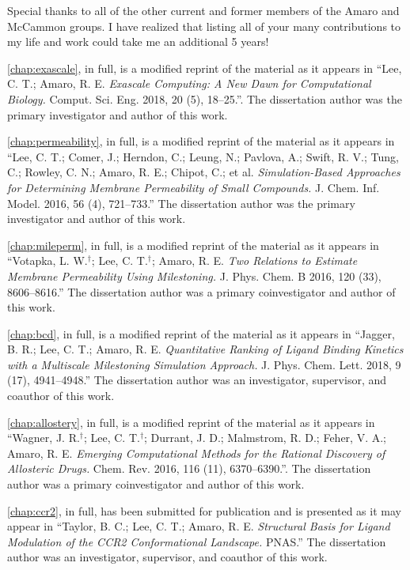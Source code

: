 \begin{frontmatter}
\begin{acknowledgements}
\par Special thanks to all of the other current and former members of the Amaro and McCammon groups.
I have realized that listing all of your many contributions to my life and work could take me an additional 5 years!

\par \cref{chap:exascale}, in full, is a modified reprint of the material as it appears in ``Lee, C. T.; Amaro, R. E. \emph{Exascale Computing: A New Dawn for Computational Biology.} Comput. Sci. Eng. 2018, 20 (5), 18–25.''.
The dissertation author was the primary investigator and author of this work.

\par \cref{chap:permeability}, in full, is a modified reprint of the material as it appears in ``Lee, C. T.; Comer, J.; Herndon, C.; Leung, N.; Pavlova, A.; Swift, R. V.; Tung, C.; Rowley, C. N.; Amaro, R. E.; Chipot, C.; et al. \emph{Simulation-Based Approaches for Determining Membrane Permeability of Small Compounds.} J. Chem. Inf. Model. 2016, 56 (4), 721–733.''
The dissertation author was the primary investigator and author of this work.

\par \cref{chap:mileperm}, in full, is a modified reprint of the material as it appears in ``Votapka, L. W.$^{\dagger}$; Lee, C. T.$^{\dagger}$; Amaro, R. E. \emph{Two Relations to Estimate Membrane Permeability Using Milestoning.} J. Phys. Chem. B 2016, 120 (33), 8606–8616.''
The dissertation author was a primary coinvestigator and author of this work.

\par \cref{chap:bcd}, in full, is a modified reprint of the material as it appears in ``Jagger, B. R.; Lee, C. T.; Amaro, R. E. \emph{Quantitative Ranking of Ligand Binding Kinetics with a Multiscale Milestoning Simulation Approach.} J. Phys. Chem. Lett. 2018, 9 (17), 4941–4948.''
The dissertation author was an investigator, supervisor, and coauthor of this work.

\par \cref{chap:allostery}, in full, is a modified reprint of the material as it appears in ``Wagner, J. R.$^{\dagger}$; Lee, C. T.$^{\dagger}$; Durrant, J. D.; Malmstrom, R. D.; Feher, V. A.; Amaro, R. E. \emph{Emerging Computational Methods for the Rational Discovery of Allosteric Drugs.} Chem. Rev. 2016, 116 (11), 6370–6390.''.
The dissertation author was a primary coinvestigator and author of this work.

\par \cref{chap:ccr2}, in full, has been submitted for publication and is presented as it may appear in ``Taylor, B. C.; Lee, C. T.; Amaro, R. E. \emph{Structural Basis for Ligand Modulation of the CCR2 Conformational Landscape.} PNAS.''
The dissertation author was an investigator, supervisor, and coauthor of this work.


\end{acknowledgements}
\end{frontmatter}
